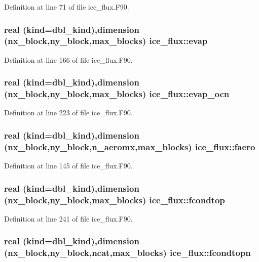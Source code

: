 Definition at line 71 of file ice\_\-flux.F90.\hypertarget{namespaceice__flux_abfe856f2125b879db70ba8a8a43aaefd}{
\subsubsection[{evap}]{\setlength{\rightskip}{0pt plus 5cm}real (kind=dbl\_\-kind),dimension (nx\_\-block,ny\_\-block,max\_\-blocks) {\bf ice\_\-flux::evap}}}
\label{namespaceice__flux_abfe856f2125b879db70ba8a8a43aaefd}


Definition at line 166 of file ice\_\-flux.F90.\hypertarget{namespaceice__flux_adea597318ddb4be7d507f86cc3b48f05}{
\subsubsection[{evap\_\-ocn}]{\setlength{\rightskip}{0pt plus 5cm}real (kind=dbl\_\-kind),dimension (nx\_\-block,ny\_\-block,max\_\-blocks) {\bf ice\_\-flux::evap\_\-ocn}}}
\label{namespaceice__flux_adea597318ddb4be7d507f86cc3b48f05}


Definition at line 223 of file ice\_\-flux.F90.\hypertarget{namespaceice__flux_ad99dce71f61486e2450ba1fc5318abb9}{
\subsubsection[{faero}]{\setlength{\rightskip}{0pt plus 5cm}real (kind=dbl\_\-kind),dimension (nx\_\-block,ny\_\-block,n\_\-aeromx,max\_\-blocks) {\bf ice\_\-flux::faero}}}
\label{namespaceice__flux_ad99dce71f61486e2450ba1fc5318abb9}


Definition at line 145 of file ice\_\-flux.F90.\hypertarget{namespaceice__flux_a0ba73c84e3792cf8704a33f6d95e7f95}{
\subsubsection[{fcondtop}]{\setlength{\rightskip}{0pt plus 5cm}real (kind=dbl\_\-kind),dimension (nx\_\-block,ny\_\-block,max\_\-blocks) {\bf ice\_\-flux::fcondtop}}}
\label{namespaceice__flux_a0ba73c84e3792cf8704a33f6d95e7f95}


Definition at line 241 of file ice\_\-flux.F90.\hypertarget{namespaceice__flux_a0f22ed9bcb531d5ea26305f27ed19d05}{
\subsubsection[{fcondtopn}]{\setlength{\rightskip}{0pt plus 5cm}real (kind=dbl\_\-kind),dimension (nx\_\-block,ny\_\-block,ncat,max\_\-blocks) {\bf ice\_\-flux::fcondtopn}}}
\label{namespaceice__flux_a0f22ed9bcb531d5ea26305f27ed19d05}


